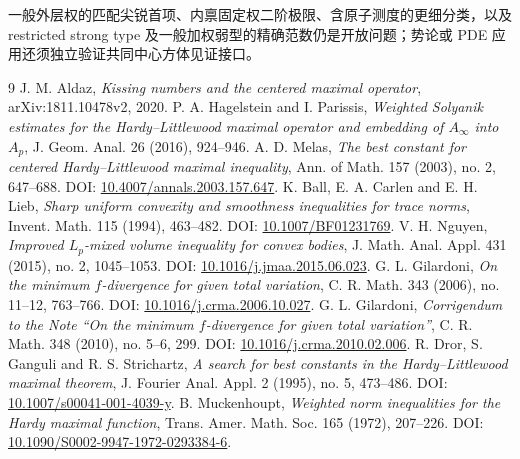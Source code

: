 \documentclass[UTF8,11pt,fontset=none]{ctexart}
\theoremstyle{definition}\newtheorem{theorem}{定理}[section]\newtheorem{lemma}[theorem]{引理}\newtheorem{corollary}[theorem]{推论}\newtheorem{proposition}[theorem]{命题}
\theoremstyle{remark}\newtheorem{remark}[theorem]{说明}
\begin{document}
一般外层权的匹配尖锐首项、内禀固定权二阶极限、含原子测度的更细分类，以及 restricted strong type 及一般加权弱型的精确范数仍是开放问题；势论或 PDE 应用还须独立验证共同中心方体见证接口。
\clearpage
\begin{thebibliography}{9}
 J. M. Aldaz, \emph{Kissing numbers and the centered maximal operator}, arXiv:1811.10478v2, 2020.
 P. A. Hagelstein and I. Parissis, \emph{Weighted Solyanik estimates for the Hardy--Littlewood maximal operator and embedding of $A_\infty$ into $A_p$}, J. Geom. Anal. 26 (2016), 924--946.
 A. D. Melas, \emph{The best constant for centered Hardy--Littlewood maximal inequality}, Ann. of Math. 157 (2003), no. 2, 647--688. DOI: \href{https://doi.org/10.4007/annals.2003.157.647}{10.4007/annals.2003.157.647}.
 K. Ball, E. A. Carlen and E. H. Lieb, \emph{Sharp uniform convexity and smoothness inequalities for trace norms}, Invent. Math. 115 (1994), 463--482. DOI: \href{https://doi.org/10.1007/BF01231769}{10.1007/BF01231769}.
 V. H. Nguyen, \emph{Improved $L_p$-mixed volume inequality for convex bodies}, J. Math. Anal. Appl. 431 (2015), no. 2, 1045--1053. DOI: \href{https://doi.org/10.1016/j.jmaa.2015.06.023}{10.1016/j.jmaa.2015.06.023}.
 G. L. Gilardoni, \emph{On the minimum $f$-divergence for given total variation}, C. R. Math. 343 (2006), no. 11--12, 763--766. DOI: \href{https://doi.org/10.1016/j.crma.2006.10.027}{10.1016/j.crma.2006.10.027}.
 G. L. Gilardoni, \emph{Corrigendum to the Note ``On the minimum $f$-divergence for given total variation''}, C. R. Math. 348 (2010), no. 5--6, 299. DOI: \href{https://doi.org/10.1016/j.crma.2010.02.006}{10.1016/j.crma.2010.02.006}.
 R. Dror, S. Ganguli and R. S. Strichartz, \emph{A search for best constants in the Hardy--Littlewood maximal theorem}, J. Fourier Anal. Appl. 2 (1995), no. 5, 473--486. DOI: \href{https://doi.org/10.1007/s00041-001-4039-y}{10.1007/s00041-001-4039-y}.
 B. Muckenhoupt, \emph{Weighted norm inequalities for the Hardy maximal function}, Trans. Amer. Math. Soc. 165 (1972), 207--226. DOI: \href{https://doi.org/10.1090/S0002-9947-1972-0293384-6}{10.1090/S0002-9947-1972-0293384-6}.
\end{thebibliography}
\end{document}
